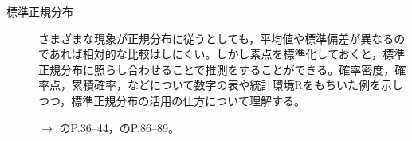 \begin{description}
	\item[標準正規分布]さまざまな現象が正規分布に従うとしても，平均値や標準偏差が異なるのであれば相対的な比較はしにくい。しかし素点を標準化しておくと，標準正規分布に照らし合わせることで推測をすることができる。確率密度，確率点，累積確率，などについて数字の表や統計環境Rをもちいた例を示しつつ，標準正規分布の活用の仕方について理解する。
	      \begin{flushright}
		      $\to$ \textcite{Kawabata201408}のP.36--44，\textcite{Yamada2004}のP.86--89。
	      \end{flushright}






\end{description}
